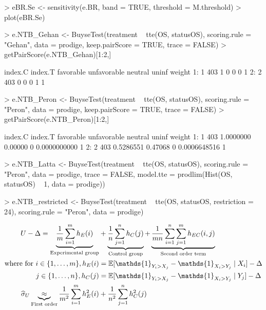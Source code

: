 \documentclass[12pt]{article}
\theoremstyle{definition}
\begin{document}
\begin{Rcode}
> eBR.Se <- sensitivity(e.BR, band = TRUE,
                      threshold = M.threshold)
> plot(eBR.Se)
\end{Rcode}


\begin{Rcode}
> e.NTB_Gehan <- BuyseTest(treatment ~ tte(OS, statusOS), scoring.rule = "Gehan", 
                         data = prodige, keep.pairScore = TRUE, trace = FALSE)
> getPairScore(e.NTB_Gehan)[1:2,]
\end{Rcode}
\begin{Routput}
   index.C index.T favorable unfavorable neutral uninf weight
1:       1     403         1           0       0     0      1
2:       2     403         0           0       0     1      1
\end{Routput}

\begin{Rcode}
> e.NTB_Peron <- BuyseTest(treatment ~ tte(OS, statusOS), scoring.rule = "Peron", 
                         data = prodige, keep.pairScore = TRUE, trace = FALSE)
> getPairScore(e.NTB_Peron)[1:2,]
\end{Rcode}
\begin{Routput}
   index.C index.T favorable unfavorable neutral        uninf weight
1:       1     403 1.0000000     0.00000       0 0.0000000000      1
2:       2     403 0.5286551     0.47068       0 0.0006648516      1
\end{Routput}


\begin{Rcode}
> e.NTB_Latta <- BuyseTest(treatment ~ tte(OS, statusOS), scoring.rule = "Peron", 
                           data = prodige, trace = FALSE,
                           model.tte = prodlim(Hist(OS, statusOS) ~ 1, data = prodige))
\end{Rcode}



\begin{Rcode}
> e.NTB_restricted <- BuyseTest(treatment ~ tte(OS, statusOS, restriction = 24), 
                                scoring.rule = "Peron", data = prodige)
\end{Rcode}


\clearpage

\begin{align*}
	U - \Delta = \underbrace{\frac{1}{m} \sum_{i=1}^{m} h_E(i)}_{\text{Experimental group}}&  + \underbrace{\frac{1}{n} \sum_{j=1}^{n} h_C(j)}_{\text{Control group}} + \underbrace{ \frac{1}{m n}  \sum_{i=1}^{n}\sum_{j=1}^{m} h_{EC}(i,j)}_{\text{Second order term}} \notag \\
	\text{where for } i \in \{1,\ldots,m\}, h_E(i)&=\mathbb{E}[\mathds{1}_{Y_i > X_j} - \mathds{1}_{X_i > Y_j}\mid X_i] - \Delta \notag \\
	j \in \{1,\ldots,n\}, h_C(j)&=\mathbb{E}[\mathds{1}_{Y_i > X_j} - \mathds{1}_{X_i > Y_j}\mid Y_j] - \Delta \notag  \\
 \widehat{\sigma}_{U} \underbrace{\approx}_{\text{First order}} \frac{1}{m^2} \sum_{i=1}^m h^2_E(i) &+ \frac{1}{n^2} \sum_{j=1}^n h^2_C(j)
\end{align*}
\end{document}
